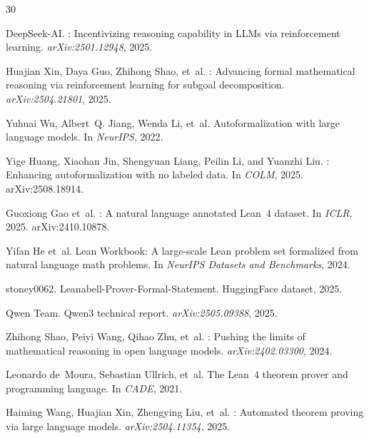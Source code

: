 \documentclass[11pt,a4paper]{article}
\begin{document}
\begin{thebibliography}{30}

{DeepSeek-AI}.
: Incentivizing reasoning capability in {LLMs} via reinforcement learning.
\newblock \emph{arXiv:2501.12948}, 2025.

Huajian Xin, Daya Guo, Zhihong Shao, et~al.
: Advancing formal mathematical reasoning via reinforcement learning for subgoal decomposition.
\newblock \emph{arXiv:2504.21801}, 2025.

Yuhuai Wu, Albert~Q. Jiang, Wenda Li, et~al.
\newblock Autoformalization with large language models.
\newblock In \emph{NeurIPS}, 2022.

Yige Huang, Xiaohan Jin, Shengyuan Liang, Peilin Li, and Yuanzhi Liu.
: Enhancing autoformalization with no labeled data.
\newblock In \emph{COLM}, 2025. arXiv:2508.18914.

Guoxiong Gao et~al.
: A natural language annotated {L}ean~4 dataset.
\newblock In \emph{ICLR}, 2025. arXiv:2410.10878.

Yifan He et~al.
\newblock Lean {W}orkbook: A large-scale {L}ean problem set formalized from natural language math problems.
\newblock In \emph{NeurIPS Datasets and Benchmarks}, 2024.

stoney0062.
\newblock Leanabell-Prover-Formal-Statement.
\newblock HuggingFace dataset, 2025.

{Qwen Team}.
\newblock Qwen3 technical report.
\newblock \emph{arXiv:2505.09388}, 2025.

Zhihong Shao, Peiyi Wang, Qihao Zhu, et~al.
: Pushing the limits of mathematical reasoning in open language models.
\newblock \emph{arXiv:2402.03300}, 2024.

Leonardo de~Moura, Sebastian Ullrich, et~al.
\newblock The {L}ean~4 theorem prover and programming language.
\newblock In \emph{CADE}, 2021.

Haiming Wang, Huajian Xin, Zhengying Liu, et~al.
: Automated theorem proving via large language models.
\newblock \emph{arXiv:2504.11354}, 2025.


\end{thebibliography}
\end{document}
